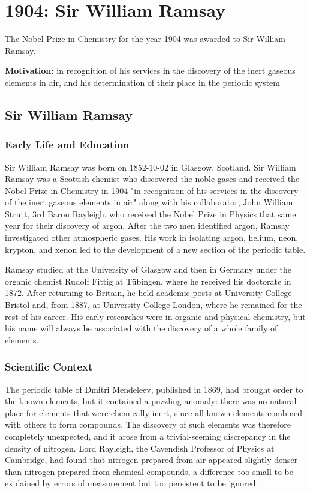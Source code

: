 \chapter{1904: Sir William Ramsay}
\label{chap:chemistry1904}

The Nobel Prize in Chemistry for the year 1904 was awarded to Sir William Ramsay.

\textbf{Motivation:}
in recognition of his services in the discovery of the inert gaseous elements in air, and his determination of their place in the periodic system

\section{Sir William Ramsay}

\subsection*{Early Life and Education}

Sir William Ramsay was born on 1852-10-02 in Glasgow, Scotland.
Sir William Ramsay was a Scottish chemist who discovered the noble gases and received the Nobel Prize in Chemistry in 1904 "in recognition of his services in the discovery of the inert gaseous elements in air" along with his collaborator, John William Strutt, 3rd Baron Rayleigh, who received the Nobel Prize in Physics that same year for their discovery of argon. After the two men identified argon, Ramsay investigated other atmospheric gases. His work in isolating argon, helium, neon, krypton, and xenon led to the development of a new section of the periodic table.

Ramsay studied at the University of Glasgow and then in Germany under the organic chemist Rudolf Fittig at Tübingen, where he received his doctorate in 1872. After returning to Britain, he held academic posts at University College Bristol and, from 1887, at University College London, where he remained for the rest of his career. His early researches were in organic and physical chemistry, but his name will always be associated with the discovery of a whole family of elements.

\subsection*{Scientific Context}

The periodic table of Dmitri Mendeleev, published in 1869, had brought order to the known elements, but it contained a puzzling anomaly: there was no natural place for elements that were chemically inert, since all known elements combined with others to form compounds. The discovery of such elements was therefore completely unexpected, and it arose from a trivial-seeming discrepancy in the density of nitrogen. Lord Rayleigh, the Cavendish Professor of Physics at Cambridge, had found that nitrogen prepared from air appeared slightly denser than nitrogen prepared from chemical compounds, a difference too small to be explained by errors of measurement but too persistent to be ignored.

